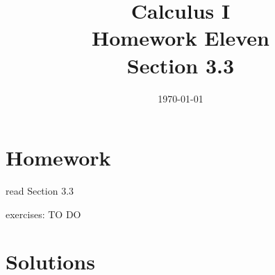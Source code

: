 \documentclass[letterpaper, landscape]{exam}
\title{Calculus I \\ Homework Eleven \\ Section 3.3}
\author{}
\date{\today}
\begin{document}
  \maketitle

  \section{Homework}
    \begin{itemize*}
      \item read Section 3.3
      \item exercises: TO DO
    \end{itemize*}

  \ifprintanswers

  \section{Solutions}
\end{document}
